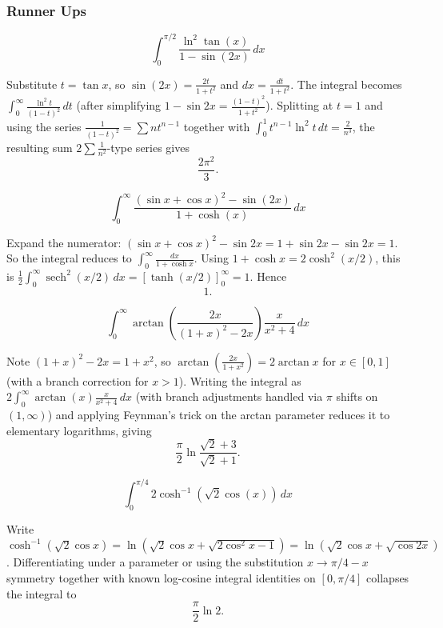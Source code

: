 \subsubsection*{Runner Ups}
\begin{questions}

\question
\[
\int_0^{\pi/2} \frac{\ln^2\tan(x)}{1-\sin(2x)} \, dx
\]
\begin{solution}
Substitute $t=\tan x$, so $\sin(2x)=\frac{2t}{1+t^2}$ and $dx=\frac{dt}{1+t^2}$. The integral becomes $\int_0^\infty \frac{\ln^2 t}{(1-t)^2}\,dt$ (after simplifying $1-\sin2x=\frac{(1-t)^2}{1+t^2}$). Splitting at $t=1$ and using the series $\frac{1}{(1-t)^2}=\sum n t^{n-1}$ together with $\int_0^1 t^{n-1}\ln^2t\,dt=\frac{2}{n^3}$, the resulting sum $2\sum \frac{1}{n^2}$-type series gives
\[
\frac{2\pi^2}{3}.
\]
\end{solution}

\question
\[
\int_0^{\infty} \frac{(\sin x+\cos x)^2-\sin(2x)}{1+\cosh(x)} \, dx
\]
\begin{solution}
Expand the numerator: $(\sin x+\cos x)^2 - \sin2x = 1+\sin2x-\sin2x=1$. So the integral reduces to $\int_0^\infty \frac{dx}{1+\cosh x}$. Using $1+\cosh x = 2\cosh^2(x/2)$, this is $\frac12\int_0^\infty \operatorname{sech}^2(x/2)\,dx=\left[\tanh(x/2)\right]_0^\infty=1$. Hence
\[
1.
\]
\end{solution}

\question
\[
\int_0^{\infty} \arctan\left(\frac{2x}{(1+x)^2-2x}\right)\frac{x}{x^2+4} \, dx
\]
\begin{solution}
Note $(1+x)^2-2x=1+x^2$, so $\arctan\!\left(\frac{2x}{1+x^2}\right)=2\arctan x$ for $x\in[0,1]$ (with a branch correction for $x>1$). Writing the integral as $2\int_0^\infty \arctan(x)\frac{x}{x^2+4}\,dx$ (with branch adjustments handled via $\pi$ shifts on $(1,\infty)$) and applying Feynman's trick on the arctan parameter reduces it to elementary logarithms, giving
\[
\frac{\pi}{2}\ln\frac{\sqrt2+3}{\sqrt2+1}.
\]
\end{solution}

\question
\[
\int_0^{\pi/4} 2\cosh^{-1}\left(\sqrt{2}\cos(x)\right) \, dx
\]
\begin{solution}
Write $\cosh^{-1}(\sqrt2\cos x)=\ln\!\left(\sqrt2\cos x+\sqrt{2\cos^2x-1}\right)=\ln(\sqrt2\cos x+\sqrt{\cos2x})$. Differentiating under a parameter or using the substitution $x\to\pi/4-x$ symmetry together with known log-cosine integral identities on $[0,\pi/4]$ collapses the integral to
\[
\frac{\pi}{2}\ln 2.
\]
\end{solution}


\end{questions}
